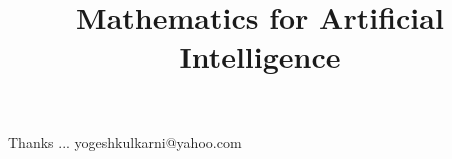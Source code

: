 \documentclass[xcolor=dvipsnames,compress,t,pdf,9pt]{beamer}
\title[\insertframenumber /\inserttotalframenumber]{Mathematics for Artificial Intelligence}
\begin{document}
	\begin{frame}
	\titlepage
	\end{frame}
	
	

	\begin{frame}[c]{}
	Thanks ...
	\vspace{5mm}
	yogeshkulkarni@yahoo.com
	\end{frame}
\end{document}
